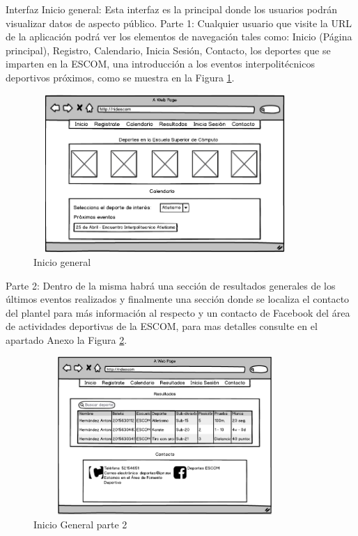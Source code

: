 	\noindent Interfaz Inicio general: Esta interfaz es la principal donde los usuarios podrán visualizar datos de aspecto público. 
	\newline
	Parte 1:
	Cualquier usuario que visite la URL de la aplicación podrá ver los elementos de navegación tales como: Inicio (Página principal), Registro, Calendario, Inicia Sesión, Contacto, los deportes que se imparten en la ESCOM, una introducción a los eventos interpolitécnicos deportivos próximos, como se muestra en la Figura \ref{inicioGeneral}. 
	\newline
	\begin{figure}[hbt!]
		\centering
		\includegraphics[width=10cm, height=6cm]{Imagenes/Disenos/Iniciogeneral}
		\caption{Inicio general}
		\label{inicioGeneral}
	\end{figure}
	
	Parte 2:
	Dentro de la misma habrá una sección de resultados generales de los últimos eventos realizados y finalmente una  sección donde se localiza el contacto del plantel para más información al respecto y un contacto de Facebook del área de actividades deportivas de la ESCOM, para mas detalles consulte en el apartado Anexo la Figura \ref{inicioGeneral1}.
	
	\begin{figure}[hbt!]
		\centering
		\includegraphics[width=10cm, height=6cm]{Imagenes/Disenos/Iniciogeneral1}
		\caption{Inicio General parte 2}
		\label{inicioGeneral1}
	\end{figure}
	
